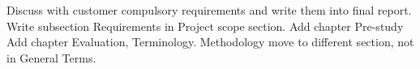 \nextItem Discuss with customer compulsory requirements and write them into final report.
\nextItem Write subsection Requirements in Project scope section.
\nextItem Add chapter Pre-study 
\nextItem Add chapter Evaluation, Terminology.
\nextItem Methodology move to different section, not in General Terms. 
